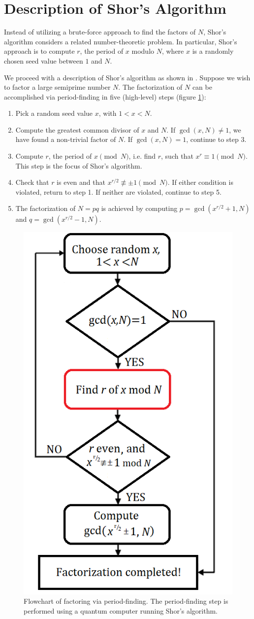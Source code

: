 \documentclass{article}
\begin{document}
\section{Description of Shor's Algorithm}
\label{sec:ShorsDescription}
Instead of utilizing a brute-force approach to find the factors of $N$, Shor's algorithm considers a related number-theoretic problem. In particular, Shor's approach is to compute $r$, the period of $x$ modulo $N$, where $x$ is a randomly chosen seed value between $1$ and $N$. 

We proceed with a description of Shor's algorithm as shown in \cite{NC00}. Suppose we wish to factor a large semiprime number $N$. The factorization of $N$ can be accomplished via period-finding in five (high-level) steps (figure \ref{fig:flowchart}): 
\begin{enumerate}
\item Pick a random seed value $x$, with $1<x<N$.
\item Compute the greatest common divisor of $x$ and $N$. If $\gcd(x,N) \not= 1$, we have found a non-trivial factor of $N$. If $\gcd(x,N)=1$, continue to step 3.
\item Compute $r$, the period of $x \pmod{N}$, i.e. find $r$, such that $x^r \equiv 1 \pmod{N}$. This step is the focus of Shor's algorithm.
\item Check that $r$ is even and that $x^{r/2} \not \equiv \pm 1 \pmod{N}$. If either condition is violated, return to step 1. If neither are violated, continue to step 5.
\item The factorization of $N=pq$ is achieved by computing $p = \gcd(x^{r/2}+1, N)$ and $q = \gcd(x^{r/2}-1, N)$.
\end{enumerate}


\begin{figure}[!htbp]
\centering
\includegraphics[width=.40\textwidth]
{flowchart.png}
\captionsetup{format = hang}
\caption{Flowchart of factoring via period-finding. The period-finding step is performed using a quantum computer running Shor's algorithm.}
\label{fig:flowchart}
\end{figure}
\pagebreak
\end{document}
